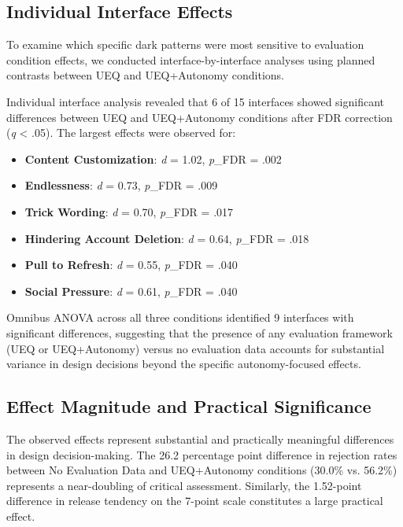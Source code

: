 \subsection{Individual Interface Effects}

To examine which specific dark patterns were most sensitive to evaluation condition effects, we conducted interface-by-interface analyses using planned contrasts between UEQ and UEQ+Autonomy conditions.

Individual interface analysis revealed that 6 of 15 interfaces showed significant differences between UEQ and UEQ+Autonomy conditions after FDR correction (\textit{q} < .05). The largest effects were observed for:

\begin{itemize}
\item \textbf{Content Customization}: \textit{d} = 1.02, \textit{p}_{FDR} = .002
\item \textbf{Endlessness}: \textit{d} = 0.73, \textit{p}_{FDR} = .009  
\item \textbf{Trick Wording}: \textit{d} = 0.70, \textit{p}_{FDR} = .017
\item \textbf{Hindering Account Deletion}: \textit{d} = 0.64, \textit{p}_{FDR} = .018
\item \textbf{Pull to Refresh}: \textit{d} = 0.55, \textit{p}_{FDR} = .040
\item \textbf{Social Pressure}: \textit{d} = 0.61, \textit{p}_{FDR} = .040
\end{itemize}

Omnibus ANOVA across all three conditions identified 9 interfaces with significant differences, suggesting that the presence of any evaluation framework (UEQ or UEQ+Autonomy) versus no evaluation data accounts for substantial variance in design decisions beyond the specific autonomy-focused effects.

\subsection{Effect Magnitude and Practical Significance}

The observed effects represent substantial and practically meaningful differences in design decision-making. The 26.2 percentage point difference in rejection rates between No Evaluation Data and UEQ+Autonomy conditions (30.0\% vs. 56.2\%) represents a near-doubling of critical assessment. Similarly, the 1.52-point difference in release tendency on the 7-point scale constitutes a large practical effect.

